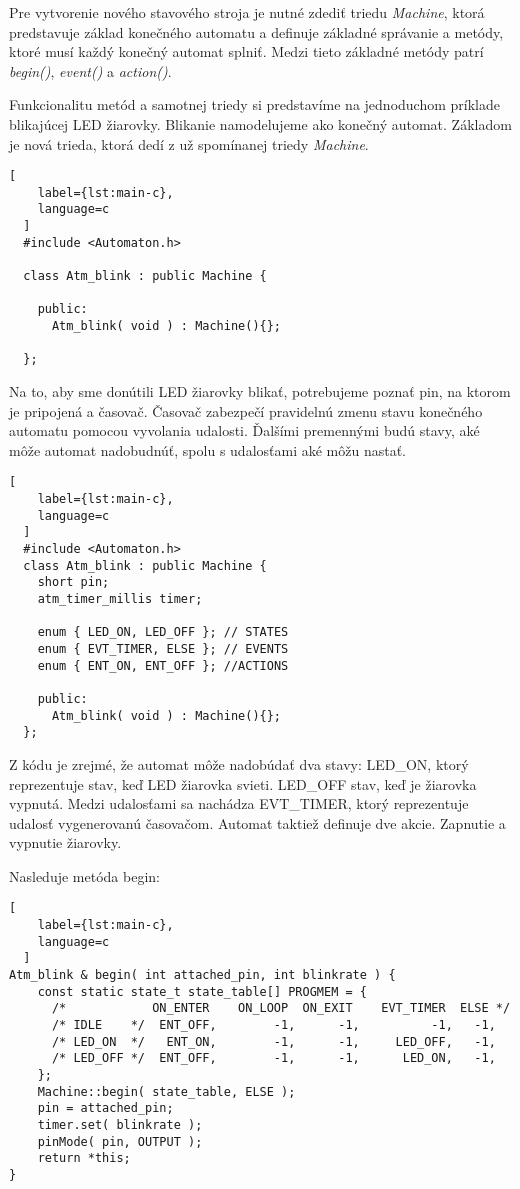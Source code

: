 \noindent \par Pre vytvorenie nového stavového stroja je nutné zdediť triedu \textit{Machine}, ktorá predstavuje základ konečného automatu a definuje základné správanie a metódy, ktoré musí každý konečný automat splniť. Medzi tieto základné metódy patrí \textit{begin()}, \textit{event()} a \textit{action()}.
\par Funkcionalitu metód a samotnej triedy si predstavíme na jednoduchom príklade blikajúcej LED žiarovky. Blikanie namodelujeme ako konečný automat. Základom je nová trieda, ktorá dedí z už spomínanej triedy \textit{Machine}.
\begin{lstlisting}[
    label={lst:main-c},
    language=c
  ]
  #include <Automaton.h>

  class Atm_blink : public Machine {
  
    public:
      Atm_blink( void ) : Machine(){};
  
  };
\end{lstlisting}

Na to, aby sme donútili LED žiarovky blikať, potrebujeme poznať pin, na ktorom je
pripojená a časovač. Časovač zabezpečí pravidelnú zmenu stavu konečného automatu pomocou vyvolania udalosti. Ďalšími premennými budú stavy, aké môže automat nadobudnúť, spolu s udalosťami aké môžu nastať.

\begin{lstlisting}[
    label={lst:main-c},
    language=c
  ]
  #include <Automaton.h>
  class Atm_blink : public Machine { 
    short pin;
    atm_timer_millis timer;

    enum { LED_ON, LED_OFF }; // STATES
    enum { EVT_TIMER, ELSE }; // EVENTS
    enum { ENT_ON, ENT_OFF }; //ACTIONS

    public:
      Atm_blink( void ) : Machine(){};  
  };
\end{lstlisting}
Z kódu je zrejmé, že automat môže nadobúdať dva stavy: LED\_ON, ktorý reprezentuje stav, keď LED žiarovka svieti. LED\_OFF stav, keď je žiarovka vypnutá.
Medzi udalosťami sa nachádza EVT\_TIMER, ktorý reprezentuje udalosť vygenerovanú časovačom. Automat taktiež definuje dve akcie. Zapnutie a vypnutie žiarovky.
\par Nasleduje metóda begin:
\begin{lstlisting}[
    label={lst:main-c},
    language=c
  ]
Atm_blink & begin( int attached_pin, int blinkrate ) {
    const static state_t state_table[] PROGMEM = {
      /*            ON_ENTER    ON_LOOP  ON_EXIT    EVT_TIMER  ELSE */
      /* IDLE    */  ENT_OFF,        -1,      -1,          -1,   -1,
      /* LED_ON  */   ENT_ON,        -1,      -1,     LED_OFF,   -1,
      /* LED_OFF */  ENT_OFF,        -1,      -1,      LED_ON,   -1,
    };
    Machine::begin( state_table, ELSE );
    pin = attached_pin; 
    timer.set( blinkrate ); 
    pinMode( pin, OUTPUT ); 
    return *this;          
}
\end{lstlisting}

